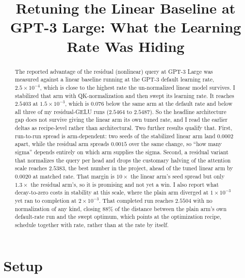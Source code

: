 \documentclass[mlabstract,onecolumn]{jmlr}
\title[Retuning the Linear Baseline at GPT-3 Large]%
{Retuning the Linear Baseline at GPT-3 Large:\titlebreak
 What the Learning Rate Was Hiding}
\author{\Name{Simon Sang}}
\begin{document}
\maketitle

\begin{abstract}
The reported advantage of the residual (nonlinear) query at GPT-3 Large was measured
against a linear baseline running at the GPT-3 default learning rate,
$2.5\times10^{-4}$, which is close to the highest rate the un-normalized linear model
survives. I stabilized that arm with QK-normalization and then swept its learning rate.
It reaches $2.5403$ at $1.5\times10^{-3}$, which is $0.076$ below the same arm at the
default rate and below all three of my residual-GELU runs ($2.5464$ to $2.5487$). So the
headline architecture gap does not survive giving the linear arm its own tuned rate, and
I read the earlier deltas as recipe-level rather than architectural. Two further results
qualify that. First, run-to-run spread is arm-dependent: two seeds of the stabilized
linear arm land $0.0002$ apart, while the residual arm spreads $0.0015$ over the same
change, so ``how many sigma'' depends entirely on which arm supplies the sigma. Second, a
residual variant that normalizes the query per head and drops the customary halving of
the attention scale reaches $2.5383$, the best number in the project, ahead of the tuned
linear arm by $0.0020$ at matched rate. That margin is $10\times$ the linear arm's seed
spread but only $1.3\times$ the residual arm's, so it is promising and not yet a win. I
also report what decay-to-zero costs in stability at this scale, where the plain arm
diverged at $1\times10^{-3}$ yet ran to completion at $2\times10^{-3}$. That completed run
reaches $2.5504$ with no normalization of any kind, closing $88\%$ of the distance between
the plain arm's own default-rate run and the swept optimum, which points at the optimization
recipe, schedule together with rate, rather than at the rate by itself.
\end{abstract}

\section{Setup}
\label{sec:setup}
\end{document}
